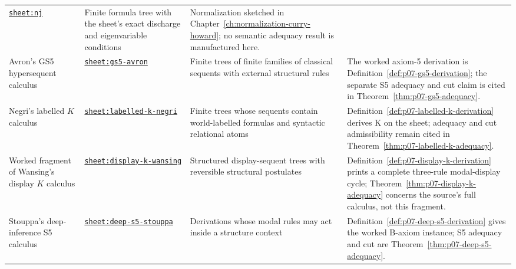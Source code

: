 \begin{longtable}{@{}p{}p{}p{}
  p{}@{}}
\hyperref[sheet:nj]{\texttt{sheet:nj}} & Finite formula tree with the
sheet's exact discharge and eigenvariable conditions & Normalization sketched
in Chapter~\ref{ch:normalization-curry-howard}; no semantic adequacy
result is manufactured here. \\
Avron's GS5 hypersequent calculus &
\hyperref[sheet:gs5-avron]{\texttt{sheet:gs5-avron}} & Finite trees of
finite families of classical sequents with external structural rules & The
worked axiom-5 derivation is Definition~\ref{def:p07-gs5-derivation}; the
separate S5 adequacy and cut claim is cited in
Theorem~\ref{thm:p07-gs5-adequacy}. \\
Negri's labelled \(K\) calculus &
\hyperref[sheet:labelled-k-negri]{\texttt{sheet:labelled-k-negri}} & Finite
trees whose sequents contain world-labelled formulas and syntactic relational
atoms & Definition~\ref{def:p07-labelled-k-derivation} derives K on the sheet;
adequacy and cut admissibility remain cited in
Theorem~\ref{thm:p07-labelled-k-adequacy}. \\
Worked fragment of Wansing's display \(K\) calculus &
\hyperref[sheet:display-k-wansing]{\texttt{sheet:display-k-wansing}} &
Structured display-sequent trees with reversible structural postulates &
Definition~\ref{def:p07-display-k-derivation} prints a complete three-rule
modal-display cycle; Theorem~\ref{thm:p07-display-k-adequacy} concerns the
source's full calculus, not this fragment. \\
Stouppa's deep-inference S5 calculus &
\hyperref[sheet:deep-s5-stouppa]{\texttt{sheet:deep-s5-stouppa}} & Derivations
whose modal rules may act inside a structure context &
Definition~\ref{def:p07-deep-s5-derivation} gives the worked B-axiom instance;
S5 adequacy and cut are Theorem~\ref{thm:p07-deep-s5-adequacy}. \\
\bottomrule
\end{longtable}
\endgroup

